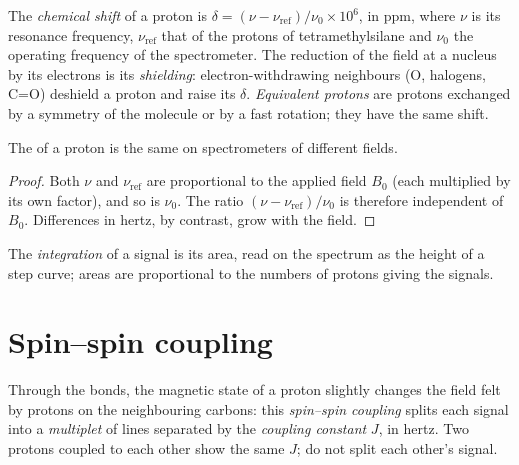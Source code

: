 \begin{definition}\label{def:b1:structure-spectroscopy:chemical-shift}
The \emph{chemical shift} of a proton is
$\delta = (\nu - \nu_{\text{ref}})/\nu_0 \times 10^6$, in \unit{ppm}, where
$\nu$ is its resonance frequency, $\nu_{\text{ref}}$ that of the protons
of tetramethylsilane and $\nu_0$ the operating frequency of the
spectrometer. The reduction of the field at a nucleus by its electrons is
its \emph{shielding}: electron-withdrawing neighbours
(O, halogens, C=O) deshield a proton and raise its $\delta$.
\emph{Equivalent protons} are protons exchanged
by a symmetry of the molecule or by a fast rotation; they have the same
shift.
\end{definition}

\begin{proposition}\label{prop:b1:structure-spectroscopy:shift-field-independent}
The  of a proton is the same on spectrometers of different
fields.
\end{proposition}

\begin{proof}
Both $\nu$ and $\nu_{\text{ref}}$ are proportional to the applied field
$B_0$ (each multiplied by its own  factor), and so is $\nu_0$.
The ratio $(\nu - \nu_{\text{ref}})/\nu_0$ is therefore independent of
$B_0$. Differences in hertz, by contrast, grow with the field.
\end{proof}

\begin{definition}[Integration]\label{def:b1:structure-spectroscopy:integration}
The \emph{integration} of a signal is its area, read
on the spectrum as the height of a step curve; areas are proportional to
the numbers of protons giving the signals.
\end{definition}

\section{Spin--spin coupling}

\begin{definition}\label{def:b1:structure-spectroscopy:coupling}
Through the bonds, the magnetic state of a proton slightly changes the
field felt by protons on the neighbouring carbons: this
\emph{spin--spin coupling} splits each signal
into a \emph{multiplet} of lines separated by the
\emph{coupling constant} $J$, in hertz. Two
protons coupled to each other show the same $J$;  do
not split each other's signal.
\end{definition}

